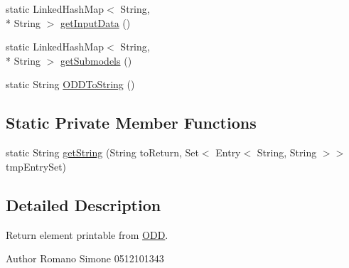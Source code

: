 \begin{DoxyCompactItemize}
\item 
static Linked\-Hash\-Map$<$ String, \\*
String $>$ \hyperlink{classit_1_1isislab_1_1masonhelperdocumentation_1_1_o_d_d_1_1_o_d_d_information_as_string_a9dab0ca8316964b0927cea9121599123}{get\-Input\-Data} ()
\item 
static Linked\-Hash\-Map$<$ String, \\*
String $>$ \hyperlink{classit_1_1isislab_1_1masonhelperdocumentation_1_1_o_d_d_1_1_o_d_d_information_as_string_aec1f50d75c19c658cf4b7a2ae7c6603c}{get\-Submodels} ()
\item 
static String \hyperlink{classit_1_1isislab_1_1masonhelperdocumentation_1_1_o_d_d_1_1_o_d_d_information_as_string_ab8dcbc3306a8622fe5f4b547e9b68a32}{O\-D\-D\-To\-String} ()
\end{DoxyCompactItemize}
\subsection*{Static Private Member Functions}
\begin{DoxyCompactItemize}
\item 
static String \hyperlink{classit_1_1isislab_1_1masonhelperdocumentation_1_1_o_d_d_1_1_o_d_d_information_as_string_ac202df97ab97e5f7e946475dbb4f0627}{get\-String} (String to\-Return, Set$<$ Entry$<$ String, String $>$$>$ tmp\-Entry\-Set)
\end{DoxyCompactItemize}


\subsection{Detailed Description}
Return element printable from \hyperlink{classit_1_1isislab_1_1masonhelperdocumentation_1_1_o_d_d_1_1_o_d_d}{O\-D\-D}. \begin{DoxyAuthor}{Author}
Romano Simone 0512101343 
\end{DoxyAuthor}


